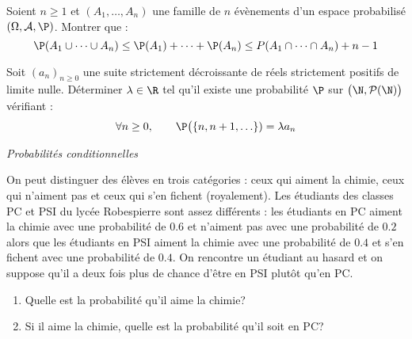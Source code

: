 \documentclass[a4paper,10pt]{report}
\begin{document}
\begin{Exercice}{} Soient $n \geq 1$ et $(A_1, \ldots, A_n)$ une famille de $n$ évènements d'un espace probabilisé $(\Omega, \mathcal{A}, \P)$. Montrer que :
$$ \P(A_1 \cup \cdots \cup A_n) \leq \P(A_1) + \cdots + \P(A_n) \leq P(A_1 \cap \cdots \cap A_n) + n-1$$
\end{Exercice}



\begin{Exercice}{} Soit $(a_n)_{n \geq 0}$ une suite strictement décroissante de réels strictement positifs de limite nulle.  Déterminer $\lambda \in \R$ tel qu'il existe une probabilité $\P$ sur $\bigl(\N,\mathcal{P}(\N)\bigr)$ vérifiant :
    \[
    \forall n \geq 0, \qquad \P\bigl( \lbrace n, n+1, \ldots \rbrace) = \lambda a_n
    \]
\end{Exercice} 




\medskip

\begin{center}
\textit{{ {\large Probabilités conditionnelles}}}
\end{center}

\medskip

\begin{Exercice}{} On peut distinguer des élèves en trois catégories : ceux qui aiment la chimie, ceux qui n'aiment pas et ceux qui s'en fichent (royalement). Les étudiants des classes PC et PSI du lycée Robespierre sont assez différents : les étudiants en PC aiment la chimie avec une probabilité de $0.6$ et n'aiment pas avec une probabilité de $0.2$ alors que les étudiants en PSI aiment la chimie avec une probabilité de $0.4$ et s'en fichent avec une probabilité de $0.4$. On rencontre un étudiant au hasard et on suppose qu'il a deux fois plus de chance d'être en PSI plutôt qu'en PC.

\begin{enumerate}
\item Quelle est la probabilité qu'il aime la chimie?
\item Si il aime la chimie, quelle est la probabilité qu'il soit en PC?
\end{enumerate}
\end{Exercice}
\end{document}
